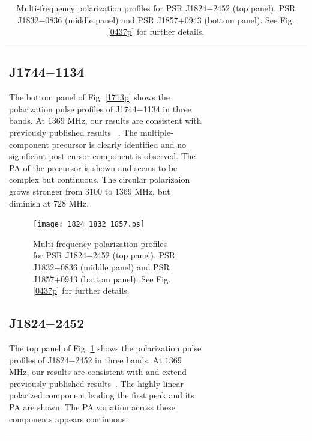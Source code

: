 \documentclass[useAMS,usenatbib]{mn2e}
\begin{document}
\begin{table}
\begin{center}
\begin{tabular}{lcccccccccccc}
\subsection{J1744$-$1134}

The bottom panel of Fig. \ref{1713p} shows the polarization pulse profiles of J1744$-$1134 
in three bands.
%
At $1369$ MHz, our results are consistent with previously published results
~\citep{Yan11}.
%
The multiple-component precursor is clearly identified and no significant 
post-cursor component is observed.
%
The PA of the precursor is shown and seems to be complex but continuous.
%
The circular polarizaion grows stronger from $3100$ to $1369$ MHz, but diminish 
at $728$ MHz.



\begin{figure}
\begin{center}
\texttt{[image: 1824\_1832\_1857.ps]}
\caption{Multi-frequency polarization profiles for PSR J1824$-$2452 (top 
panel), PSR J1832$-$0836 (middle panel) and PSR J1857$+$0943 (bottom panel). 
See Fig. \ref{0437p} for further details.}
\label{1824p}
\end{center}
\end{figure}

\subsection{J1824$-$2452}

The top panel of Fig. \ref{1824p} shows the polarization pulse profiles of 
J1824$-$2452 
in three bands.
%
At $1369$ MHz, our results are consistent with and extend previously published 
results~\citep{Yan11}.
%
The highly linear polarized component leading the first peak and its PA 
are shown.
%
The PA variation across these components appears continuous.
%



\end{tabular}
\end{center}
\end{table}
\end{document}
